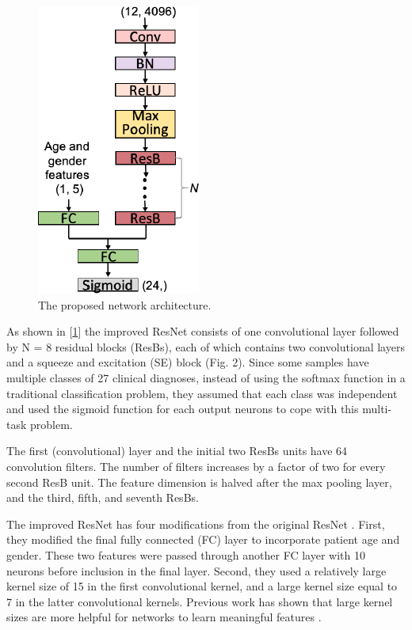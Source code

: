 \begin{figure}[H]
\centering
\includegraphics[scale=0.5]{img/team_two_network.png}
\caption{The proposed network architecture.}
\label{fig:team_two_network}
\end{figure}


As shown in [\ref{fig:team_two_network}] the improved ResNet consists of one convolutional layer followed by N = 8 residual blocks (ResBs), each of which contains two convolutional layers and a squeeze and excitation (SE) block (Fig. 2). Since some samples have multiple classes of 27 clinical diagnoses, instead of using the softmax function in a traditional classification problem, they assumed that each class was independent and used the sigmoid function for each output neurons to cope with this multi-task problem.

The first (convolutional) layer and the initial two ResBs units have 64 convolution filters. The number of filters increases by a factor of two for every second ResB unit. The feature dimension is halved after the max pooling layer, and the third, fifth, and seventh ResBs.

The improved ResNet has four modifications from the original ResNet \cite{he2015delving}. First, they modified the final fully connected (FC) layer to incorporate patient age and gender. These two features were passed through another FC layer with 10 neurons before inclusion in the final layer. Second, they used a relatively large kernel size of 15 in the first convolutional kernel, and a large kernel size equal to 7 in the latter convolutional kernels. Previous work has shown that large kernel sizes are more helpful for networks to learn meaningful features \cite{hannun2019cardiologist}. 


